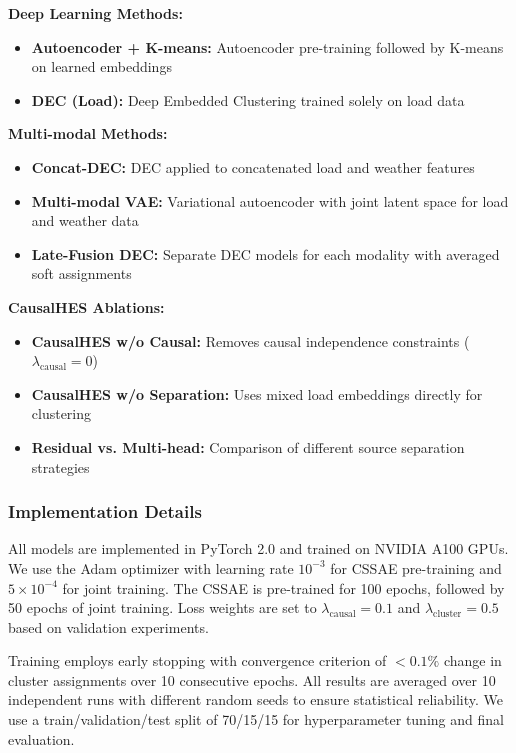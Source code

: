 \documentclass[journal]{IEEEtran}
\begin{document}
\textbf{Deep Learning Methods:}
\begin{itemize}
    \item \textbf{Autoencoder + K-means:} Autoencoder pre-training followed by K-means on learned embeddings
    \item \textbf{DEC (Load):} Deep Embedded Clustering \cite{deep_embedding_clustering_xie} trained solely on load data
\end{itemize}

\textbf{Multi-modal Methods:}
\begin{itemize}
    \item \textbf{Concat-DEC:} DEC applied to concatenated load and weather features
    \item \textbf{Multi-modal VAE:} Variational autoencoder with joint latent space for load and weather data
    \item \textbf{Late-Fusion DEC:} Separate DEC models for each modality with averaged soft assignments
\end{itemize}

\textbf{CausalHES Ablations:}
\begin{itemize}
    \item \textbf{CausalHES w/o Causal:} Removes causal independence constraints ($\lambda_{\text{causal}} = 0$)
    \item \textbf{CausalHES w/o Separation:} Uses mixed load embeddings directly for clustering
    \item \textbf{Residual vs. Multi-head:} Comparison of different source separation strategies
\end{itemize}

\subsubsection{Implementation Details}
All models are implemented in PyTorch 2.0 and trained on NVIDIA A100 GPUs. We use the Adam optimizer with learning rate $10^{-3}$ for CSSAE pre-training and $5 \times 10^{-4}$ for joint training. The CSSAE is pre-trained for 100 epochs, followed by 50 epochs of joint training. Loss weights are set to $\lambda_{\text{causal}} = 0.1$ and $\lambda_{\text{cluster}} = 0.5$ based on validation experiments.

Training employs early stopping with convergence criterion of $<0.1\%$ change in cluster assignments over 10 consecutive epochs. All results are averaged over 10 independent runs with different random seeds to ensure statistical reliability. We use a train/validation/test split of 70/15/15 for hyperparameter tuning and final evaluation.
\end{document}
